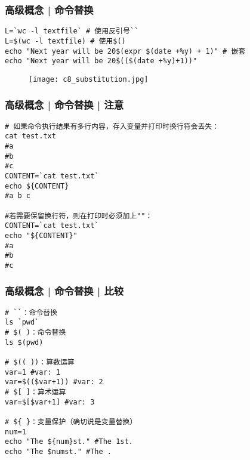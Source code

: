 \begin{frame}[fragile]
  \frametitle{高级概念 | \alert{命令替换}}
\begin{lstlisting}
L=`wc -l textfile` # 使用反引号``
L=$(wc -l textfile) # 使用$()
echo "Next year will be 20$(expr $(date +%y) + 1)" # 嵌套
echo "Next year will be 20$(($(date +%y)+1))"
\end{lstlisting}
\vspace{-0.5em}
  \begin{figure}
    \centering
    \texttt{[image: c8\_substitution.jpg]}
  \end{figure}
\end{frame}

\begin{frame}[fragile]
  \frametitle{高级概念 | 命令替换 | \alert{注意}}
  \vspace{-0.5em}
\begin{lstlisting}
# 如果命令执行结果有多行内容，存入变量并打印时换行符会丢失：
cat test.txt
#a
#b
#c
CONTENT=`cat test.txt`
echo ${CONTENT}
#a b c

#若需要保留换行符，则在打印时必须加上""：
CONTENT=`cat test.txt`
echo "${CONTENT}"
#a
#b
#c
\end{lstlisting}
\end{frame}

\begin{frame}[fragile]
  \frametitle{高级概念 | 命令替换 | \alert{比较}}
\begin{lstlisting}
# ``：命令替换
ls `pwd`
# $( )：命令替换
ls $(pwd)

# $(( ))：算数运算
var=1 #var: 1
var=$(($var+1)) #var: 2
# $[ ]：算术运算
var=$[$var+1] #var: 3

# ${ }：变量保护（确切说是变量替换）
num=1
echo "The ${num}st." #The 1st.
echo "The $numst." #The .
\end{lstlisting}
\end{frame}

